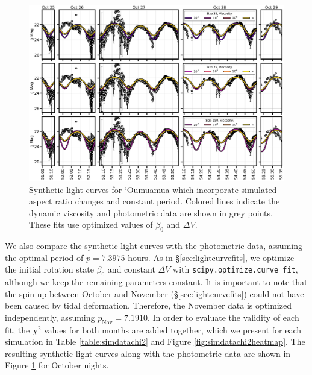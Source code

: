 \documentclass[twocolumn,doublespacing]{aastex631}
\begin{document}
\begin{figure}
\centering
\includegraphics[width=.94\textwidth,angle=0]{optimal_sims_lightcurve_comp.pdf}
\caption{Synthetic light curves for `Oumuamua which incorporate simulated aspect ratio changes and constant period. Colored lines indicate the dynamic viscosity and photometric data are shown in grey points. These fits use optimized values of $\beta_0$ and $\Delta V$.}
\label{fig:optimalaxiscurvesimdata}
\end{figure}

We also compare the synthetic light curves with the photometric data, assuming the optimal period of $p=7.3975$ hours. As in \S \ref{sec:lightcurvefits}, we optimize the initial rotation state $\beta_0$ and constant $\Delta V$ with \texttt{scipy.optimize.curve\_fit}, although we keep the remaining parameters constant. It is important to note that the spin-up between October and November (\S\ref{sec:lightcurvefits}) could not have been caused by tidal deformation. Therefore, the November data is optimized independently, assuming $p_\text{Nov}=7.1910$. In order to evaluate the validity of each fit, the $\chi^2$ values for both months are added together, which we present for each simulation in Table \ref{table:simdatachi2} and Figure \ref{fig:simdatachi2heatmap}. The resulting synthetic light curves along with the photometric data are shown in Figure \ref{fig:optimalaxiscurvesimdata} for October nights. 
\end{document}
